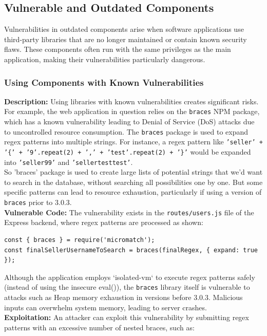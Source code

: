 \documentclass[]{article}
\begin{document}
\subsection{Vulnerable and Outdated Components}

Vulnerabilities in outdated components arise when software applications use third-party libraries that are no longer maintained or contain known security flaws. These components often run with the same privileges as the main application, making their vulnerabilities particularly dangerous.

\subsubsection{Using Components with Known Vulnerabilities}

\textbf{Description:}
Using libraries with known vulnerabilities creates significant risks. For example, the web application in question relies on the \texttt{braces} NPM package, which has a known vulnerability leading to Denial of Service (DoS) attacks due to uncontrolled resource consumption. The \texttt{braces} package is used to expand regex patterns into multiple strings. For instance, a regex pattern like \texttt{'seller' + '\{' + '9'.repeat(2) + ',' + 'test'.repeat(2) + '\}'} would be expanded into \texttt{'seller99'} and \texttt{'sellertesttest'}. \\ 
So 'braces' package is used to create large lists of potential strings that we'd want to search in the database, without searching all possibilities one by one. But some specific patterns can lead to resource exhaustion, particularly if using a version of \texttt{braces} prior to 3.0.3. \\ 
\textbf{Vulnerable Code:}
The vulnerability exists in the \texttt{routes/users.js} file of the Express backend, where regex patterns are processed as shown:

\begin{lstlisting}
const { braces } = require('micromatch');
const finalSellerUsernameToSearch = braces(finalRegex, { expand: true });
\end{lstlisting}
Although the application employs `isolated-vm` to execute regex patterns safely (instead of using the insecure eval()), the \texttt{braces} library itself is vulnerable to attacks such as Heap memory exhaustion in versions before 3.0.3. Malicious inputs can overwhelm system memory, leading to server crashes. \\ 
\textbf{Exploitation:}
An attacker can exploit this vulnerability by submitting regex patterns with an excessive number of nested braces, such as:
\end{document}
